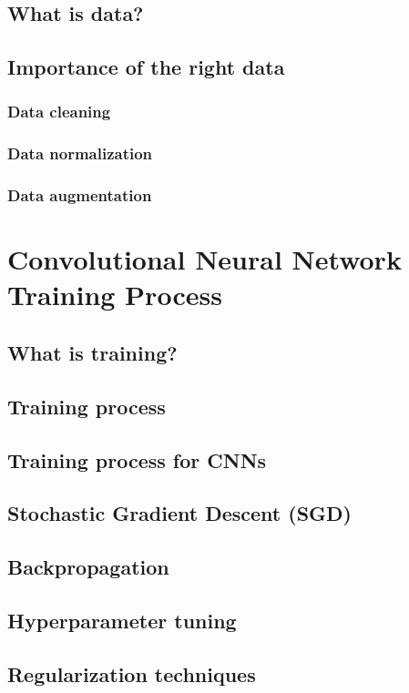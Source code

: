 \section{What is data?}

\section{Importance of the right data}
\subsection{Data cleaning}
\subsection{Data normalization}
\subsection{Data augmentation}

\chapter{Convolutional Neural Network Training Process}

\section{What is training?}
\section{Training process}
\section{Training process for CNNs}
\section{Stochastic Gradient Descent (SGD)}
\section{Backpropagation}
\section{Hyperparameter tuning}
\section{Regularization techniques}

